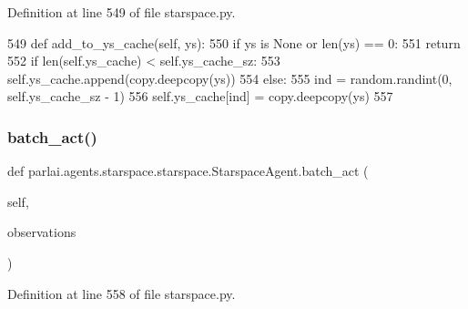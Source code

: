 Definition at line 549 of file starspace.\+py.


\begin{DoxyCode}
549     \textcolor{keyword}{def }add\_to\_ys\_cache(self, ys):
550         \textcolor{keywordflow}{if} ys \textcolor{keywordflow}{is} \textcolor{keywordtype}{None} \textcolor{keywordflow}{or} len(ys) == 0:
551             \textcolor{keywordflow}{return}
552         \textcolor{keywordflow}{if} len(self.ys\_cache) < self.ys\_cache\_sz:
553             self.ys\_cache.append(copy.deepcopy(ys))
554         \textcolor{keywordflow}{else}:
555             ind = random.randint(0, self.ys\_cache\_sz - 1)
556             self.ys\_cache[ind] = copy.deepcopy(ys)
557 
\end{DoxyCode}
\mbox{\label{classparlai_1_1agents_1_1starspace_1_1starspace_1_1StarspaceAgent_a426f2fb245c6a0a409365c4662aec2d2}} 
\subsubsection{\texorpdfstring{batch\+\_\+act()}{batch\_act()}}
{\footnotesize\ttfamily def parlai.\+agents.\+starspace.\+starspace.\+Starspace\+Agent.\+batch\+\_\+act (\begin{DoxyParamCaption}\item[{}]{self,  }\item[{}]{observations }\end{DoxyParamCaption})}



Definition at line 558 of file starspace.\+py.


